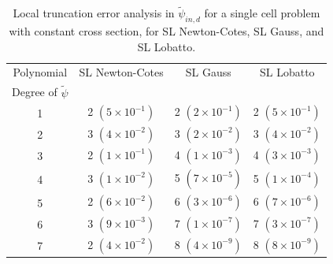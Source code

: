 \begin{table}[!htp]
\centering
\caption{Local truncation error analysis in $\widetilde{\psi}_{in,d}$ for a single cell problem with constant cross section, for SL Newton-Cotes, SL Gauss, and SL Lobatto. }
\begin{tabular}{|c|c|c|c|} 
\hline
  Polynomial 										 & SL Newton-Cotes 				& SL Gauss 			 						& SL Lobatto  \\
  Degree  of $\widetilde{\psi}$	& {}		 							 		& {}   										&	 {}   \\
	\hline
				1   										&	2 $(5\times 10^{-1})$		&	2 $(2\times 10^{-1})$		&	2 $(5\times 10^{-1})$	\\
		\hline
				2   										& 3 $(4\times 10^{-2})$		&	3  $(2\times 10^{-2})$	&	3 $(4\times 10^{-2})$		\\
		\hline	
				3   										&	2 $(1\times 10^{-1})$		& 4 $(1\times 10^{-3})$		&	4 $(3\times 10^{-3})$	\\
		\hline
				4   										&	3 $(1\times 10^{-2})$		&	5 $(7\times 10^{-5})$		&	5 $(1\times 10^{-4})$	\\
		\hline	
				5   										&	2 $(6\times 10^{-2})$		&	6 $(3\times 10^{-6})$		&	6 $(7\times 10^{-6})$	\\
		\hline		
				6   										&	3 $(9\times 10^{-3})$		&	7 $(1\times 10^{-7})$		&	7 $(3\times 10^{-7})$	\\
		\hline		
				7   										&	2 $(4\times 10^{-2})$		&	8 $(4\times 10^{-9})$		&	8 $(8\times 10^{-9})$	\\
		\hline		
\end{tabular}
\label{tbl:taylor_in_part2} 
\end{table}
%
%
